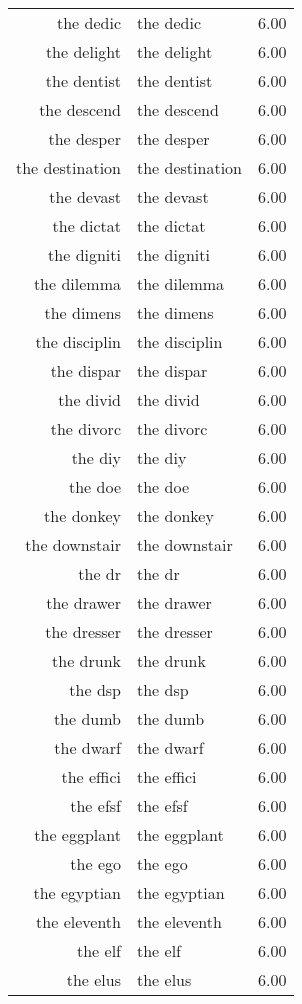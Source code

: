 \begin{table}[ht]
\begin{tabular}{rlr}
  the dedic & the dedic & 6.00 \\ 
  the delight & the delight & 6.00 \\ 
  the dentist & the dentist & 6.00 \\ 
  the descend & the descend & 6.00 \\ 
  the desper & the desper & 6.00 \\ 
  the destination & the destination & 6.00 \\ 
  the devast & the devast & 6.00 \\ 
  the dictat & the dictat & 6.00 \\ 
  the digniti & the digniti & 6.00 \\ 
  the dilemma & the dilemma & 6.00 \\ 
  the dimens & the dimens & 6.00 \\ 
  the disciplin & the disciplin & 6.00 \\ 
  the dispar & the dispar & 6.00 \\ 
  the divid & the divid & 6.00 \\ 
  the divorc & the divorc & 6.00 \\ 
  the diy & the diy & 6.00 \\ 
  the doe & the doe & 6.00 \\ 
  the donkey & the donkey & 6.00 \\ 
  the downstair & the downstair & 6.00 \\ 
  the dr & the dr & 6.00 \\ 
  the drawer & the drawer & 6.00 \\ 
  the dresser & the dresser & 6.00 \\ 
  the drunk & the drunk & 6.00 \\ 
  the dsp & the dsp & 6.00 \\ 
  the dumb & the dumb & 6.00 \\ 
  the dwarf & the dwarf & 6.00 \\ 
  the effici & the effici & 6.00 \\ 
  the efsf & the efsf & 6.00 \\ 
  the eggplant & the eggplant & 6.00 \\ 
  the ego & the ego & 6.00 \\ 
  the egyptian & the egyptian & 6.00 \\ 
  the eleventh & the eleventh & 6.00 \\ 
  the elf & the elf & 6.00 \\ 
  the elus & the elus & 6.00 \\ 

\end{tabular}
\end{table}
